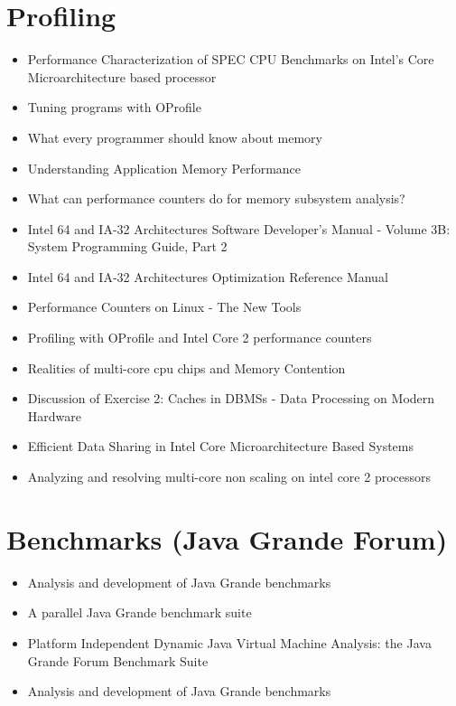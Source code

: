 \section{Profiling}
\label{sec:lr-profiling}

\begin{itemize}
\item Performance Characterization of SPEC CPU Benchmarks on Intel's
  Core Microarchitecture based processor \cite{Bird2007}
\item Tuning programs with OProfile \cite{Cohen2004}
\item What every programmer should know about memory
  \cite{Drepper2007}
\item Understanding Application Memory Performance \cite{Drepper2008}
\item What can performance counters do for memory subsystem analysis?
  \cite{Eranian2008}
\item Intel \textsuperscript{\textregistered} 64 and IA-32
  Architectures Software Developer’s Manual - Volume 3B: System
  Programming Guide, Part 2 \cite{Intel2010}
\item Intel \textsuperscript{\textregistered} 64 and IA-32
  Architectures Optimization Reference Manual \cite{Intel2009}
\item Performance Counters on Linux - The New Tools \cite{Melo2009}
\item Profiling with OProfile and Intel Core 2 performance counters
  \cite{Nielsen2008}
\item Realities of multi-core cpu chips and Memory Contention
  \cite{Barker2009}
\item Discussion of Exercise 2: Caches in DBMSs - Data Processing on
  Modern Hardware \cite{Muller2009}
\item Efficient Data Sharing in Intel
  \textsuperscript{\textregistered} Core Microarchitecture Based
  Systems \cite{Shemer2007}
\item Analyzing and resolving multi-core non scaling on intel core 2
  processors \cite{Levinthal2007}
\end{itemize}


\section{Benchmarks (Java Grande Forum)}
\label{sec:lr-benchmarks-java}

\begin{itemize}
\item Analysis and development of Java Grande benchmarks
  \cite{Mathew1999}
\item A parallel Java Grande benchmark suite \cite{Smith2001}
\item Platform Independent Dynamic Java Virtual Machine Analysis: the
  Java Grande Forum Benchmark Suite \cite{Gregg2003}
\item Analysis and development of Java Grande benchmarks
  \cite{Mathew1999a}
\end{itemize}


